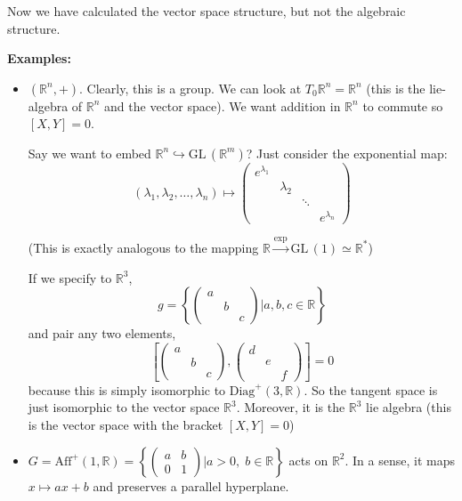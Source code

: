 \documentclass[12pt]{article}
\newcommand{\R}{\mathbb{R}}
\newcommand{\GL}{\text{GL}\,}
\begin{document}
    Now we have calculated the vector space structure, but not the algebraic structure. 

    \textbf{Examples:} 
    \begin{itemize}
        \item $(\R^n, +)$. Clearly, this is a group. We can look at $T_0\R^n = \R^n$ (this is the lie-algebra of $\R^n$ and the vector space). We want addition in $\R^n$ to commute so $[X, Y] = 0$. 
        
        Say we want to embed $\R^n \hookrightarrow \GL(\R^m)$? Just consider the exponential map:
        \[(\lambda_1, \lambda_2, \dots, \lambda_n) \mapsto \begin{pmatrix}
            e^{\lambda_1}\\ 
            & \lambda_2\\ 
            & & \ddots\\
            & & & e^{\lambda_n}
        \end{pmatrix}\]

        (This is exactly analogous to the mapping $\R \overset{\exp}{\to} \GL(1) \simeq \R^*$)

        If we specify to $\R^3$, 
        \[g =\left\{\begin{pmatrix}
                a\\ 
                & b\\ 
                & & c
            \end{pmatrix} \bigg\vert a, b, c \in \R \right\}\]
        and pair any two elements, 
        \[\left[\begin{pmatrix}
            a\\ 
            & b\\ 
            & & c
        \end{pmatrix}, \begin{pmatrix}
            d\\ 
            & e\\ 
            & & f
        \end{pmatrix}\right] = 0\]
        because this is simply isomorphic to $\text{Diag}^+(3, \R)$. So the tangent space is just isomorphic to the vector space $\R^3$. Moreover, it is the $\R^3$ lie algebra (this is the vector space with the bracket $[X, Y] = 0$)

        \item $G = \text{Aff}^+(1, \R) = \left\{\begin{pmatrix}
            a & b\\ 
            0 & 1
        \end{pmatrix} \bigg\vert a > 0,\; b \in \R\right\}$ acts on $\R^2$. In a sense, it maps $x \mapsto ax + b$ and preserves a parallel hyperplane. 


\end{itemize}
\end{document}
